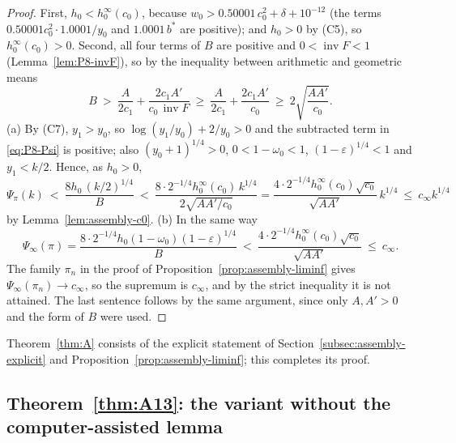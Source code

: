 \documentclass[11pt]{amsart}
\newcommand{\eps}{\varepsilon}
\newcommand{\invF}{\operatorname{inv}F}
\theoremstyle{definition}
\theoremstyle{remark}
\numberwithin{equation}{section}
\begin{document}
\begin{proof}
First, $h_0<h_0^\infty(c_0)$, because $w_0>0.50001\,c_0^2+\delta+10^{-12}$ (the terms $0.50001c_0^2\cdot1.0001/y_0$ and
$1.0001\,b^*$ are positive); and $h_0>0$ by (C5), so $h_0^\infty(c_0)>0$. Second, all four terms of $B$ are positive and
$0<\invF<1$ (Lemma~\ref{lem:P8-invF}), so by the inequality between arithmetic and geometric means
\[
B\ >\ \frac{A}{2c_1}+\frac{2c_1A'}{c_0\,\invF}\ \ge\ \frac{A}{2c_1}+\frac{2c_1A'}{c_0}\ \ge\ 2\sqrt{\frac{AA'}{c_0}} .
\]
(a) By (C7), $y_1>y_0$, so $\log(y_1/y_0)+2/y_0>0$ and the subtracted term in \eqref{eq:P8-Psi} is positive; also
$(y_0+1)^{1/4}>0$, $0<1-\omega_0<1$, $(1-\eps)^{1/4}<1$ and $y_1<k/2$. Hence, as $h_0>0$,
\[
\Psi_\pi(k)\ <\ \frac{8h_0\,(k/2)^{1/4}}{B}\ <\ \frac{8\cdot2^{-1/4}h_0^\infty(c_0)\,k^{1/4}}{2\sqrt{AA'/c_0}}
=\frac{4\cdot2^{-1/4}h_0^\infty(c_0)\sqrt{c_0}}{\sqrt{AA'}}\,k^{1/4}\ \le\ c_\infty k^{1/4}
\]
by Lemma~\ref{lem:assembly-c0}.
(b) In the same way
\[
\Psi_\infty(\pi)=\frac{8\cdot2^{-1/4}h_0(1-\omega_0)(1-\eps)^{1/4}}{B}\ <\ \frac{4\cdot2^{-1/4}h_0^\infty(c_0)\sqrt{c_0}}{\sqrt{AA'}}
\ \le\ c_\infty .
\]
The family $\pi_n$ in the proof of Proposition~\ref{prop:assembly-liminf} gives $\Psi_\infty(\pi_n)\to c_\infty$, so the
supremum is $c_\infty$, and by the strict inequality it is not attained.
The last sentence follows by the same argument, since only $A,A'>0$ and the form of $B$ were used.
\end{proof}

Theorem~\ref{thm:A} consists of the explicit statement of Section~\ref{subsec:assembly-explicit} and
Proposition~\ref{prop:assembly-liminf}; this completes its proof.

\subsection{\texorpdfstring{Theorem~\ref{thm:A13}}{Theorem A13}: the variant without the computer-assisted lemma}\label{subsec:assembly-A13}
\end{document}
